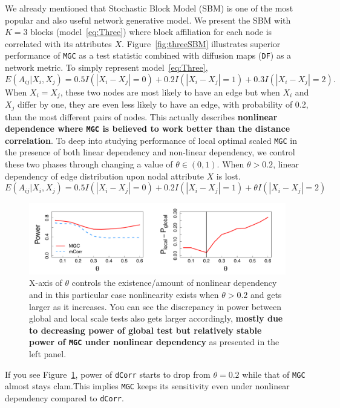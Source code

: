 \documentclass[12pt]{article}
\theoremstyle{definition}
\begin{document}
We already mentioned that Stochastic Block Model (SBM) is one of the most popular and also useful network generative model. We present the SBM with $K=3$ blocks (model~\ref{eq:Three}) where block affiliation for each node is correlated with its attributes $X$. Figure~\ref{fig:threeSBM} illustrates superior performance of \texttt{MGC} as a test statistic combined with diffusion maps (\texttt{DF}) as a network metric. To simply represent model~\ref{eq:Three},
\begin{equation}
E(A_{ij} | X_{i}, X_{j}) = 0.5 I(|X_{i} - X_{j}| = 0) + 0.2 I(|X_{i} - X_{j}| = 1) + 0.3 I(|X_{i} - X_{j}| = 2).
\end{equation}
When $X_{i} = X_{j}$, these two nodes are most likely to have an edge but when $X_{i}$ and  $X_{j}$ differ by one, they are even less likely to have an edge, with probability of 0.2, than the most different pairs of nodes. This actually describes \textbf{nonlinear dependence where \texttt{MGC} is believed to work better than the distance correlation}. To deep into studying performance of local optimal scaled \texttt{MGC} in the presence of both linear dependency and non-linear dependency, we control these two phases through changing a value of $\theta \in (0, 1)$. When $\theta > 0.2$, linear dependency of edge distribution upon nodal attribute $X$ is lost.
\begin{equation}
E(A_{ij} | X_{i}, X_{j}) = 0.5 I(|X_{i} - X_{j}| = 0) + 0.2 I(|X_{i} - X_{j}| = 1) + \theta I(|X_{i} - X_{j}| = 2)
\end{equation}
\begin{figure}[h]
	\centering
	\includegraphics[width=\linewidth]{../../Figure/powerplot_simple.pdf}
	\caption{X-axis of $\theta$ controls the existence/amount of nonlinear dependency and in this particular case nonlinearity exists when $\theta > 0.2$ and gets larger as it increases. You can see the discrepancy in power between global and local scale tests also gets larger accordingly, \textbf{mostly due to decreasing power of global test but relatively stable power of \texttt{MGC} under nonlinear dependency} as presented in the left panel.}
	\label{fig:powerplot}
\end{figure}
If you see Figure~\ref{fig:powerplot}, power of \texttt{dCorr} starts to drop from $\theta = 0.2$ while that of \texttt{MGC} almost stays clam.This implies \texttt{MGC} keeps its sensitivity even under nonlinear dependency compared to \texttt{dCorr}.
\end{document}
